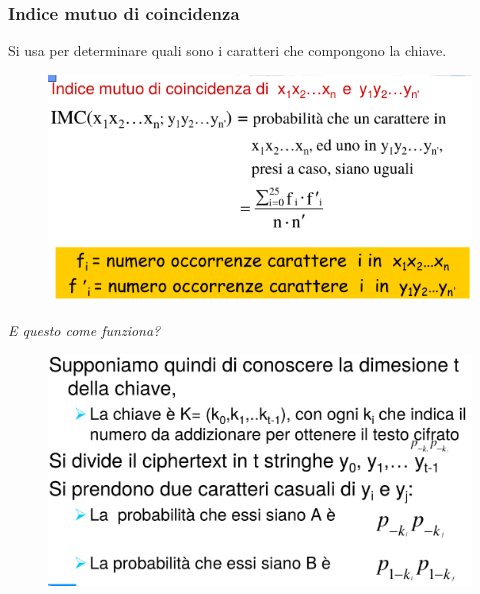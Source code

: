 \subsubsection{Indice mutuo di coincidenza}

Si usa per determinare quali sono i caratteri che compongono la chiave.

\begin{figure}[H]
    \centering
    \includegraphics[width=0.8\linewidth]{chapters/chap02/images/imc.png}
\end{figure}  

\textit{E questo come funziona?}

\begin{figure}[H]
    \centering
    \includegraphics[width=0.65\linewidth]{chapters/chap02/images/imc2.png}
\end{figure}  

